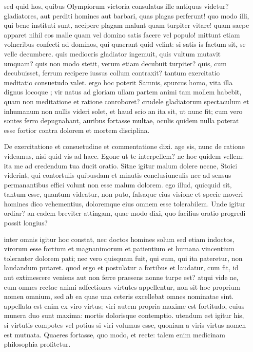  sed quid hos, quibus Olympiorum victoria consulatus ille antiquus videtur? gladiatores, aut perditi homines aut barbari, quas plagas perferunt! quo modo illi, qui bene instituti sunt, accipere plagam malunt quam turpiter vitare! quam saepe apparet nihil eos malle quam vel domino satis facere vel populo! mittunt etiam volneribus confecti ad dominos, qui quaerant quid velint: si satis is factum sit, se velle decumbere. quis mediocris gladiator ingemuit, quis vultum mutavit umquam? quis non modo stetit, verum etiam decubuit turpiter? quis, cum decubuisset, ferrum recipere iussus collum contraxit? tantum exercitatio meditatio consuetudo valet. ergo hoc poterit Samnis, spurcus homo, vita illa dignus locoque ; vir natus ad gloriam ullam partem animi tam mollem habebit, quam non meditatione et ratione conroboret? crudele gladiatorum spectaculum et inhumanum non nullis videri solet, et haud scio an ita sit, ut nunc fit; cum vero sontes ferro depugnabant, auribus fortasse multae, oculis quidem nulla poterat esse fortior contra dolorem et mortem disciplina.

 De exercitatione et consuetudine et commentatione dixi. age sis, nunc de ratione videamus, nisi quid vis ad haec. Egone ut te interpellem? ne hoc quidem vellem: ita me ad credendum tua ducit oratio. Sitne igitur malum dolere necne, Stoici viderint, qui contortulis quibusdam et minutis conclusiunculis nec ad sensus permanantibus effici volunt non esse malum dolorem. ego illud, quicquid sit, tantum esse, quantum videatur, non puto, falsaque eius visione et specie moveri homines dico vehementius, doloremque eius omnem esse tolerabilem. Unde igitur ordiar? an eadem breviter attingam, quae modo dixi, quo facilius oratio progredi possit longius?

 inter omnis igitur hoc constat, nec doctos homines solum sed etiam indoctos, virorum esse fortium et magnanimorum et patientium et humana vincentium toleranter dolorem pati; nec vero quisquam fuit, qui eum, qui ita pateretur, non laudandum putaret. quod ergo et postulatur a fortibus et laudatur, cum fit, id aut extimescere veniens aut non ferre praesens nonne turpe est? atqui vide ne, cum omnes rectae animi adfectiones virtutes appellentur, non sit hoc proprium nomen omnium, sed ab ea quae una ceteris excellebat omnes nominatae sint. appellata est enim ex viro virtus; viri autem propria maxime est fortitudo, cuius munera duo sunt maxima: mortis dolorisque contemptio. utendum est igitur his, si virtutis compotes vel potius si viri volumus esse, quoniam a viris virtus nomen est mutuata. Quaeres fortasse, quo modo, et recte: talem enim medicinam philosophia profitetur.

